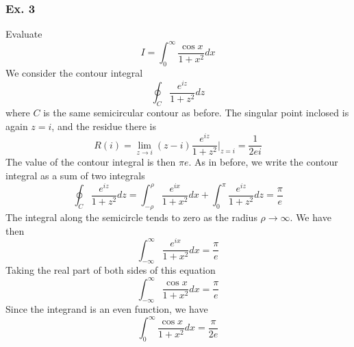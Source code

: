\documentclass[../../../main.tex]{subfiles}
\begin{document}
\subsubsection{Ex. 3} Evaluate \begin{equation*}
    I =\int_{0}^{\infty}\frac{\cos x}{1+x^2}dx
\end{equation*}
We consider the contour integral
\begin{equation*}
    \oint_C\frac{e^{iz}}{1+z^2}dz
\end{equation*}
where $C$ is the same semicircular contour as before. The singular point inclosed is again $z = i$, and the residue there is
\begin{equation*}
    R(i)=\lim_{z\rightarrow i}(z-i)\frac{e^{iz}}{1+z^2}\bigg|_{z=i}=\frac{1}{2ei}
\end{equation*}
The value of the contour integral is then $\pi e$. As in before, we write the contour integral as a sum of two integrals
\begin{equation*}
    \oint_C\frac{e^{iz}}{1+z^2}dz=\int_{-\rho}^{\rho}\frac{e^{ix}}{1+x^2}dx+\int_{0}^{\pi}\frac{e^{iz}}{1+ z^2}dz=\frac{\pi}{e}
\end{equation*}
The integral along the semicircle tends to zero as the radius $\rho\rightarrow\infty$. We have then
\begin{equation*}
    \int_{-\infty}^{\infty}\frac{e^{ix}}{1+x^2}dx=\frac{\pi}{e}
\end{equation*}
Taking the real part of both sides of this equation
\begin{equation*}
    \int_{-\infty}^{\infty}\frac{\cos x}{1+x^2}dx=\frac{\pi}{e}
\end{equation*} 
Since the integrand is an even function, we have 
\begin{equation*}
    \int_{0}^{\infty}\frac{\cos x}{1+x^2}dx=\frac{\pi}{2e}
\end{equation*}
\end{document}
